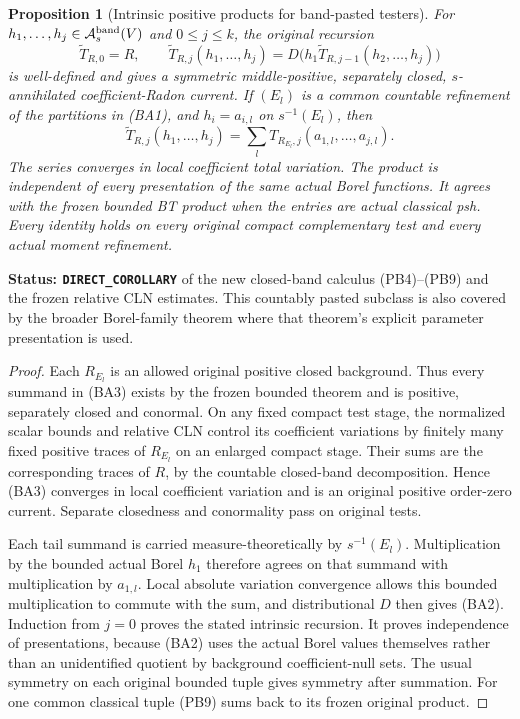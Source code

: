 \documentclass[11pt,a4paper]{article}
\numberwithin{equation}{section}
\newtheorem{proposition}[theorem]{Proposition}
\theoremstyle{definition}
\theoremstyle{remark}
\begin{document}
\begin{proposition}[Intrinsic positive products for band-pasted testers]
\label{prop:r12-band-pasted-products}
For $h_1,\ldots,h_j\in\mathcal A_s^{\rm band}(V)$ and
$0\leq j\leq k$, the original recursion
\[
 \widetilde T_{R,0}=R,\qquad
 \widetilde T_{R,j}(h_1,\ldots,h_j)
      =D\bigl(h_1\widetilde T_{R,j-1}(h_2,\ldots,h_j)\bigr)
 \tag{BA2}
\]
is well-defined and gives a symmetric middle-positive,
separately closed, $s$-annihilated coefficient-Radon current.
If $(E_l)$ is a common countable refinement of the partitions
in (BA1), and $h_i=a_{i,l}$ on $s^{-1}(E_l)$, then
\[
 \widetilde T_{R,j}(h_1,\ldots,h_j)
       =\sum_l T_{R_{E_l},j}(a_{1,l},\ldots,a_{j,l}).
 \tag{BA3}
\]
The series converges in local coefficient total variation.
The product is independent of every presentation of the
\emph{same actual Borel functions}. It agrees with the frozen
bounded BT product when the entries are actual classical psh.
Every identity holds on every original compact complementary
test and every actual moment refinement.
\end{proposition}

\noindent\textbf{Status: \texttt{DIRECT\_COROLLARY}} of the
new closed-band calculus (PB4)--(PB9) and the frozen relative
CLN estimates. This countably pasted subclass is also covered
by the broader Borel-family theorem where that theorem's
explicit parameter presentation is used.

\begin{proof}
Each $R_{E_l}$ is an allowed original positive closed background.
Thus every summand in (BA3) exists by the frozen bounded theorem
and is positive, separately closed and conormal. On any fixed
compact test stage, the normalized scalar bounds and relative
CLN control its coefficient variations by finitely many fixed
positive traces of $R_{E_l}$ on an enlarged compact stage.
Their sums are the corresponding traces of $R$, by the countable
closed-band decomposition. Hence (BA3) converges in local
coefficient variation and is an original positive order-zero
current. Separate closedness and conormality pass on original
tests.

Each tail summand is carried measure-theoretically by
$s^{-1}(E_l)$. Multiplication by the bounded actual Borel $h_1$
therefore agrees on that summand with multiplication by
$a_{1,l}$. Local absolute variation convergence allows this
bounded multiplication to commute with the sum, and distributional
$D$ then gives (BA2). Induction from $j=0$ proves the stated
intrinsic recursion. It proves independence of presentations,
because (BA2) uses the actual Borel values themselves rather than
an unidentified quotient by background coefficient-null sets.
The usual symmetry on each original bounded tuple gives symmetry
after summation. For one common classical tuple (PB9) sums back
to its frozen original product.
\end{proof}
\end{document}
